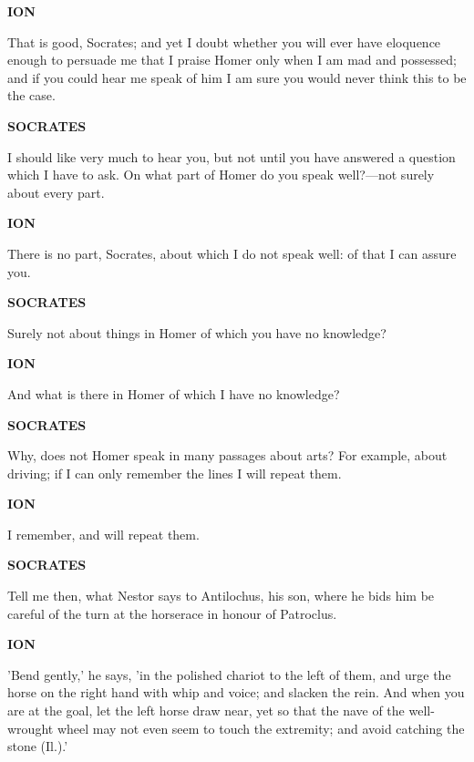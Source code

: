 \documentclass[11pt,letter]{article}
\begin{document}
\par \textbf{ION}
\par   That is good, Socrates; and yet I doubt whether you will ever have eloquence enough to persuade me that I praise Homer only when I am mad and possessed; and if you could hear me speak of him I am sure you would never think this to be the case.

\par \textbf{SOCRATES}
\par   I should like very much to hear you, but not until you have answered a question which I have to ask. On what part of Homer do you speak well?—not surely about every part.

\par \textbf{ION}
\par   There is no part, Socrates, about which I do not speak well:  of that I can assure you.

\par \textbf{SOCRATES}
\par   Surely not about things in Homer of which you have no knowledge?

\par \textbf{ION}
\par   And what is there in Homer of which I have no knowledge?

\par \textbf{SOCRATES}
\par   Why, does not Homer speak in many passages about arts? For example, about driving; if I can only remember the lines I will repeat them.

\par \textbf{ION}
\par   I remember, and will repeat them.

\par \textbf{SOCRATES}
\par   Tell me then, what Nestor says to Antilochus, his son, where he bids him be careful of the turn at the horserace in honour of Patroclus.

\par \textbf{ION}
\par   'Bend gently,' he says, 'in the polished chariot to the left of them, and urge the horse on the right hand with whip and voice; and slacken the rein. And when you are at the goal, let the left horse draw near, yet so that the nave of the well-wrought wheel may not even seem to touch the extremity; and avoid catching the stone (Il.).'
\end{document}
